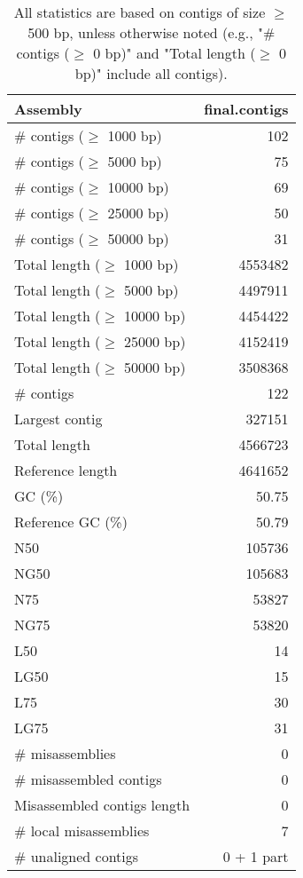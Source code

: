\documentclass[12pt,a4paper]{article}
\begin{document}
\begin{table}[ht]
\begin{center}
\caption{All statistics are based on contigs of size $\geq$ 500 bp, unless otherwise noted (e.g., "\# contigs ($\geq$ 0 bp)" and "Total length ($\geq$ 0 bp)" include all contigs).}
\begin{tabular}{|l*{1}{|r}|}
\hline
Assembly & final.contigs \\ \hline
\# contigs ($\geq$ 1000 bp) & 102 \\ \hline
\# contigs ($\geq$ 5000 bp) & 75 \\ \hline
\# contigs ($\geq$ 10000 bp) & 69 \\ \hline
\# contigs ($\geq$ 25000 bp) & 50 \\ \hline
\# contigs ($\geq$ 50000 bp) & 31 \\ \hline
Total length ($\geq$ 1000 bp) & 4553482 \\ \hline
Total length ($\geq$ 5000 bp) & 4497911 \\ \hline
Total length ($\geq$ 10000 bp) & 4454422 \\ \hline
Total length ($\geq$ 25000 bp) & 4152419 \\ \hline
Total length ($\geq$ 50000 bp) & 3508368 \\ \hline
\# contigs & 122 \\ \hline
Largest contig & 327151 \\ \hline
Total length & 4566723 \\ \hline
Reference length & 4641652 \\ \hline
GC (\%) & 50.75 \\ \hline
Reference GC (\%) & 50.79 \\ \hline
N50 & 105736 \\ \hline
NG50 & 105683 \\ \hline
N75 & 53827 \\ \hline
NG75 & 53820 \\ \hline
L50 & 14 \\ \hline
LG50 & 15 \\ \hline
L75 & 30 \\ \hline
LG75 & 31 \\ \hline
\# misassemblies & 0 \\ \hline
\# misassembled contigs & 0 \\ \hline
Misassembled contigs length & 0 \\ \hline
\# local misassemblies & 7 \\ \hline
\# unaligned contigs & 0 + 1 part \\ \hline

\end{tabular}
\end{center}
\end{table}
\end{document}
